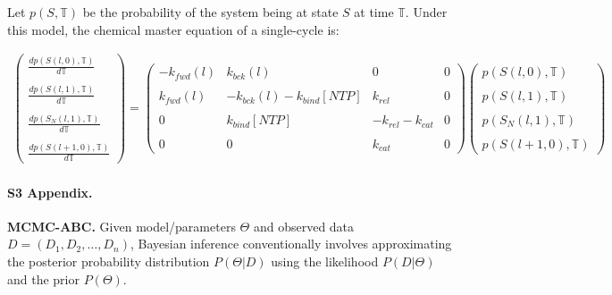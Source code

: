 \documentclass[10pt,letterpaper]{article}
\begin{document}
Let $p(S, \mathbb{T})$ be the probability of the system being at state $S$ at time $\mathbb{T}$. Under this model, the chemical master equation of a single-cycle is:


\begin{eqnarray}
    \begin{pmatrix}
        \frac{d p( S(l,0), \mathbb{T} )}{d\mathbb{T}} \\ \\
        \frac{d p( S(l,1), \mathbb{T} )}{d\mathbb{T}} \\ \\
        \frac{d p( S_N(l,1), \mathbb{T} )}{d\mathbb{T}} \\ \\
        \frac{d p( S(l+1,0), \mathbb{T} )}{d\mathbb{T}}
    \end{pmatrix} =
    \begin{pmatrix}
        -k_{fwd}(l) & k_{bck}(l) & 0 & 0 \\ \\
        k_{fwd}(l) & -k_{bck}(l) - k_{bind}[NTP] & k_{rel} & 0 \\ \\
        0 & k_{bind}[NTP] & -k_{rel} -k_{cat} & 0 \\ \\
        0 & 0 &  k_{cat} & 0
    \end{pmatrix}
    \begin{pmatrix}
        p( S(l,0), \mathbb{T} ) \\ \\
        p( S(l,1), \mathbb{T} ) \\ \\
        p( S_N(l,1), \mathbb{T} ) \\ \\
        p( S(l+1,0), \mathbb{T} )
    \end{pmatrix}
\end{eqnarray}








\paragraph*{S3 Appendix.}
\label{S3_Appendix}



\textbf{ MCMC-ABC.} Given model/parameters $\Theta$ and observed data $D = (D_1, D_2, \dotso, D_n)$, Bayesian inference conventionally involves approximating the posterior probability distribution $P(\Theta | D)$ using the likelihood $P(D|\Theta)$ and the prior $P(\Theta)$.
\end{document}

